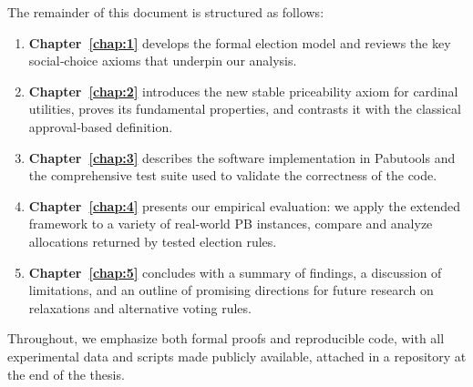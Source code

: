 The remainder of this document is structured as follows:
\begin{enumerate}
  \item \textbf{Chapter~\ref{chap:1}} develops the formal election model and reviews the key social‐choice axioms that underpin our analysis.
  \item \textbf{Chapter~\ref{chap:2}} introduces the new stable priceability axiom for cardinal utilities, proves its fundamental properties, and contrasts it with the classical approval‐based definition.
  \item \textbf{Chapter~\ref{chap:3}} describes the software implementation in Pabutools and the comprehensive test suite used to validate the correctness of the code.
  \item \textbf{Chapter~\ref{chap:4}} presents our empirical evaluation: we apply the extended framework to a variety of real‐world PB instances, compare and analyze allocations returned by tested election rules.
  \item \textbf{Chapter~\ref{chap:5}} concludes with a summary of findings, a discussion of limitations, and an outline of promising directions for future research on relaxations and alternative voting rules.
\end{enumerate}
Throughout, we emphasize both formal proofs and reproducible code, with all experimental data and scripts made publicly available, attached in a repository at the end of the thesis.